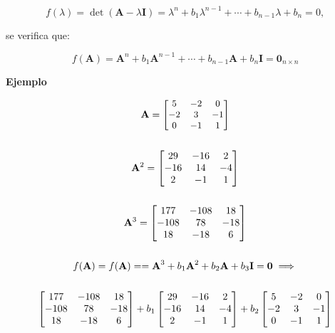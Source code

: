 \documentclass[openany]{book}
\begin{document}
\[
f(\lambda) = \det(\textbf{A} - \lambda \textbf{I}) = \lambda^n + b_1 \lambda^{n-1} + \cdots + b_{n-1} \lambda + b_n = 0,
\]

se verifica que:

\[
f(\textbf{A}) = \textbf{A}^n + b_1 \textbf{A}^{n-1} + \cdots + b_{n-1} \textbf{A} + b_n \textbf{I} = \textbf{0}_{n\times n}
\]

\textbf{Ejemplo}

\begin{gather*}
\small
\mathbf{A} = 
\begin{bmatrix} 
    5 & -2 & 0 \\ 
    -2 & 3 & -1 \\
    0 & -1 & 1    
\end{bmatrix}
\\ \\
\mathbf{A}^2 = 
\begin{bmatrix} 
    29 & -16 & 2 \\ 
    -16 & 14 & -4 \\
    2 & -1 & 1    
\end{bmatrix}
\\ \\
\mathbf{A}^3 = 
\begin{bmatrix} 
    177 & -108 & 18 \\ 
    -108 & 78 & -18 \\
    18 & -18 & 6    
\end{bmatrix} \\ \\
f(\textbf{A}) = f(\textbf{A}) = 
   = \textbf{A}^3 + b_1 \textbf{A}^{2} +  b_{2} \textbf{A} + b_3 \textbf{I} 
   = \textbf{0} \implies \\ \\
\begin{bmatrix} 
    177 & -108 & 18 \\ 
    -108 & 78 & -18 \\
    18 & -18 & 6    
\end{bmatrix}
+ b_1
\begin{bmatrix} 
    29 & -16 & 2 \\ 
    -16 & 14 & -4 \\
    2 & -1 & 1    
\end{bmatrix}
+ b_2
\begin{bmatrix} 
    5 & -2 & 0 \\ 
    -2 & 3 & -1 \\
    0 & -1 & 1    
\end{bmatrix}  \\ \\

\end{gather*}
\end{document}

